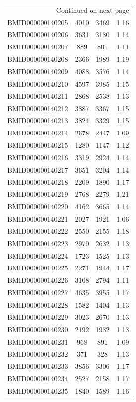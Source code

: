 \documentclass{bmcart}
\begin{document}
\begin{backmatter}
\begin{center}
\begin{longtable}{c|c|c|c}
\hline \multicolumn{4}{r}{{Continued on next page}} \\ 
\endfoot

\hline \hline
\endlastfoot
BMID000000140205 & 4010 & 3469 & 1.16 \\
BMID000000140206 & 3631 & 3180 & 1.14 \\
BMID000000140207 & 889 & 801 & 1.11 \\
BMID000000140208 & 2366 & 1989 & 1.19 \\
BMID000000140209 & 4088 & 3576 & 1.14 \\
BMID000000140210 & 4597 & 3985 & 1.15 \\
BMID000000140211 & 2868 & 2538 & 1.13 \\
BMID000000140212 & 3887 & 3367 & 1.15 \\
BMID000000140213 & 3824 & 3329 & 1.15 \\
BMID000000140214 & 2678 & 2447 & 1.09 \\
BMID000000140215 & 1280 & 1147 & 1.12 \\
BMID000000140216 & 3319 & 2924 & 1.14 \\
BMID000000140217 & 3651 & 3204 & 1.14 \\
BMID000000140218 & 2209 & 1890 & 1.17 \\
BMID000000140219 & 2768 & 2279 & 1.21 \\
BMID000000140220 & 4162 & 3665 & 1.14 \\
BMID000000140221 & 2027 & 1921 & 1.06 \\
BMID000000140222 & 2550 & 2155 & 1.18 \\
BMID000000140223 & 2970 & 2632 & 1.13 \\
BMID000000140224 & 1723 & 1525 & 1.13 \\
BMID000000140225 & 2271 & 1944 & 1.17 \\
BMID000000140226 & 3108 & 2794 & 1.11 \\
BMID000000140227 & 4635 & 3955 & 1.17 \\
BMID000000140228 & 1582 & 1404 & 1.13 \\
BMID000000140229 & 3023 & 2670 & 1.13 \\
BMID000000140230 & 2192 & 1932 & 1.13 \\
BMID000000140231 & 968 & 891 & 1.09 \\
BMID000000140232 & 371 & 328 & 1.13 \\
BMID000000140233 & 3856 & 3306 & 1.17 \\
BMID000000140234 & 2527 & 2158 & 1.17 \\
BMID000000140235 & 1840 & 1589 & 1.16 \\

\end{longtable}
\end{center}
\end{backmatter}
\end{document}
